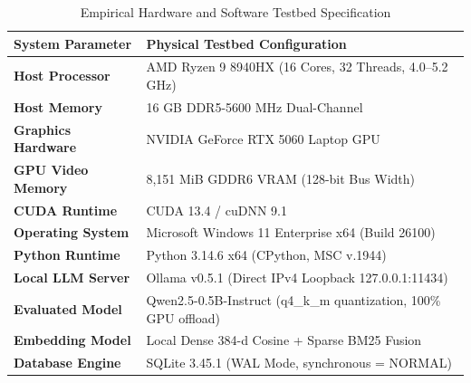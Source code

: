 \begin{table}[t]
\centering
\caption{Empirical Hardware and Software Testbed Specification}
\label{tab:testbed}
\begin{tabular}{ll}
\toprule
\textbf{System Parameter} & \textbf{Physical Testbed Configuration} \\
\midrule
\textbf{Host Processor} & AMD Ryzen 9 8940HX (16 Cores, 32 Threads, 4.0--5.2 GHz) \\
\textbf{Host Memory} & 16 GB DDR5-5600 MHz Dual-Channel \\
\textbf{Graphics Hardware} & NVIDIA GeForce RTX 5060 Laptop GPU \\
\textbf{GPU Video Memory} & 8,151 MiB GDDR6 VRAM (128-bit Bus Width) \\
\textbf{CUDA Runtime} & CUDA 13.4 / cuDNN 9.1 \\
\textbf{Operating System} & Microsoft Windows 11 Enterprise x64 (Build 26100) \\
\textbf{Python Runtime} & Python 3.14.6 x64 (CPython, MSC v.1944) \\
\textbf{Local LLM Server} & Ollama v0.5.1 (Direct IPv4 Loopback 127.0.0.1:11434) \\
\textbf{Evaluated Model} & Qwen2.5-0.5B-Instruct (q4\_k\_m quantization, 100\% GPU offload) \\
\textbf{Embedding Model} & Local Dense 384-d Cosine + Sparse BM25 Fusion \\
\textbf{Database Engine} & SQLite 3.45.1 (WAL Mode, synchronous = NORMAL) \\
\bottomrule
\end{tabular}
\end{table}
